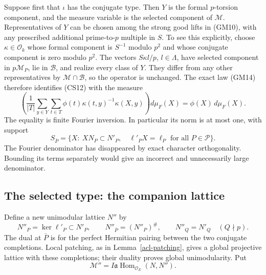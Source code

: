 Suppose first that $\iota$ has the conjugate type.  Then
$Y$ is the formal $p$-torsion component, and the measure
variable is the selected component of $\mathcal M$.
Representatives of $Y$ can be chosen among the strong good
lifts in (GM10), with any prescribed additional
prime-to-$p$ multiple in $S$.  To see this explicitly,
choose $\kappa\in\mathcal O_k$ whose formal component is
$S^{-1}$ modulo $p^2$ and whose conjugate component is zero
modulo $p^2$.  The vectors $S\kappa l/p$, $l\in\Lambda$,
have selected component in $p\mathcal M_P$, lie in
$\mathcal B$, and realize every class of $Y$.
They differ from any other representatives by
$\mathcal M\cap\mathcal B$, so the operator is unchanged.
The exact law (GM14) therefore identifies (CS12) with the
measure
\[
 \left(\frac1{|T|}\sum_{y\in Y}\sum_{t\in T}
          \phi(t)\kappa(t,y)^{-1}\kappa(X,y)\right)d\mu_F(X)
                              =\phi(X)\,d\mu_F(X).          \tag{CS14}
\]
The equality is finite Fourier inversion.  In particular its
norm is at most one, with support
\[
 S_{\bar P}=\{X:\ XN_P\subset N'_P,\quad
                        \ell'_PX=\ell_P\text{ for all }P\in\mathcal P\}.
                                                               \tag{CS15}
\]
The Fourier denominator has disappeared by exact character
orthogonality.  Bounding its terms separately would give an
incorrect and unnecessarily large denominator.

\subsection{The selected type: the companion lattice}

Define a new unimodular lattice $N''$ by
\[
 N''_P=\ker\ell'_P\subset N'_P,\qquad
 N''_{\bar P}=(N''_P)^\#,\qquad
 N''_Q=N'_Q\quad(Q\nmid p).                               \tag{CS16}
\]
The dual at $\bar P$ is for the perfect Hermitian pairing
between the two conjugate completions.
Local patching, as in Lemma~\ref{acl-patching}, gives a
global projective lattice with these completions; their
duality proves global unimodularity.  Put
\[
           \mathcal M''=I\mathfrak a
                         \operatorname{Hom}_{\mathcal O_E}(N,N'').
                                                               \tag{CS17}
\]

